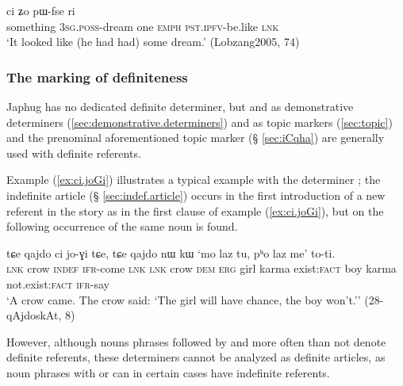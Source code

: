 \begin{exe}
\ex \label{ex:thWci.WjmNo}
 ci ʑo pɯ-fse ri \\
something \textsc{3sg}.\textsc{poss}-dream one \textsc{emph} \textsc{pst}.\textsc{ipfv}-be.like \textsc{lnk} \\
\glt `It looked like (he had had) some dream.' (Lobzang2005, 74)
 \end{exe}
 
 
\subsubsection{The marking of definiteness} \label{sec:definiteness}
Japhug has no dedicated definite determiner, but   and   as demonstrative determiners (\ref{sec:demonstrative.determiners}) and as topic markers (\ref{sec:topic}) and the prenominal aforementioned topic marker  (§ \ref{sec:iCqha}) are generally used with definite referents.  

Example (\ref{ex:ci.joGi}) illustrates a typical example with the determiner ; the indefinite article  (§ \ref{sec:indef.article}) occurs in the first introduction of a new referent in the story as in the first clause of example (\ref{ex:ci.joGi}), but on the following occurrence of the same noun  is found.

\begin{exe}
\ex \label{ex:ci.joGi}
 \gll  tɕe qajdo ci jo-ɣi tɕe, tɕe qajdo nɯ kɯ `mo laz tu, pʰo laz me' to-ti. \\
 \textsc{lnk} crow \textsc{indef} \textsc{ifr}-come \textsc{lnk} \textsc{lnk} crow \textsc{dem} \textsc{erg} girl karma exist:\textsc{fact} boy karma not.exist:\textsc{fact} \textsc{ifr}-say \\
 \glt `A crow came. The crow said: `The girl will have chance, the boy won't.'' (28-qAjdoskAt, 8)
\end{exe}

However, although nouns phrases followed by  and  more often than not denote definite referents, these determiners cannot be analyzed as definite articles, as noun phrases with  or  can in certain cases have indefinite referents. 

